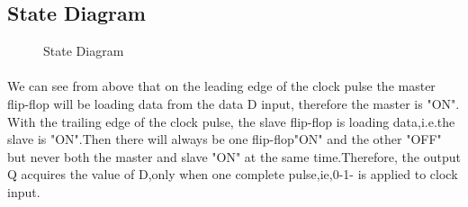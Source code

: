 \documentclass{article}
\begin{document}
\subsection{State Diagram} 
\begin{figure}[h]
    \centering
    
    \caption{State Diagram}
    \label{fig:statediag}
\end{figure}

  \paragraph{}
  We can see from above that on the leading edge of the clock pulse the master flip-flop will be loading data from the data D input, therefore the master is "ON". With the trailing edge of the clock pulse, the slave flip-flop is loading data,i.e.the slave is "ON".Then there will always be one flip-flop"ON" and the other "OFF" but never both the master and slave "ON" at the same time.Therefore, the output Q acquires the value of D,only when one complete pulse,ie,0-1- is applied to clock input.
\end{document}
